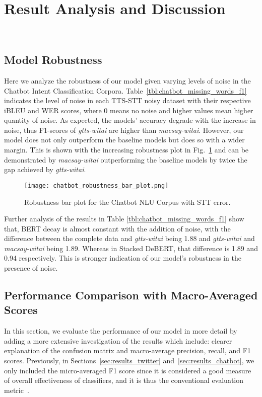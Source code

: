 \documentclass[review]{elsarticle}
\begin{document}
\section{Result Analysis and Discussion}~\label{sec:discussion}
\subsection{Model Robustness}
Here we analyze the robustness of our model given varying levels of noise in the Chatbot Intent Classification Corpora. Table~\ref{tbl:chatbot_missing_words_f1} indicates the level of noise in each TTS-STT noisy dataset with their respective iBLEU and WER scores, where 0 means no noise and higher values mean higher quantity of noise. As expected, the models' accuracy degrade with the increase in noise, thus F1-scores of \textit{gtts-witai} are higher than \textit{macsay-witai}. However, our model does not only outperform the baseline models but does so with a wider margin. This is shown with the increasing robustness plot in Fig.~\ref{fig:chatbot_stterror_robustness_curve} and can be demonstrated by \textit{macsay-witai} outperforming the baseline models by twice the gap achieved by \textit{gtts-witai}.

\begin{figure}[ht!]
   \centering
       \texttt{[image: chatbot\_robustness\_bar\_plot.png]}
   \caption{Robustness bar plot for the Chatbot NLU Corpus with STT error.}
   \label{fig:chatbot_stterror_robustness_curve}
\end{figure}

Further analysis of the results in Table \ref{tbl:chatbot_missing_words_f1} show that, BERT decay is almost constant with the addition of noise, with the difference between the complete data and \textit{gtts-witai} being 1.88 and \textit{gtts-witai} and \textit{macsay-witai} being 1.89. Whereas in Stacked DeBERT, that difference is 1.89 and 0.94 respectively. This is stronger indication of our model's robustness in the presence of noise.

\subsection{Performance Comparison with Macro-Averaged Scores}
In this section, we evaluate the performance of our model in more detail by adding a more extensive investigation of the results which include: clearer explanation of the confusion matrix and macro-average precision, recall, and F1 scores. Previously, in Sections~\ref{sec:results_twitter} and~\ref{sec:results_chatbot}, we only included the micro-averaged F1 score since it is considered a good measure of overall effectiveness of classifiers, and it is thus the conventional evaluation metric~\cite{sokolova2009systematic}.
\end{document}

